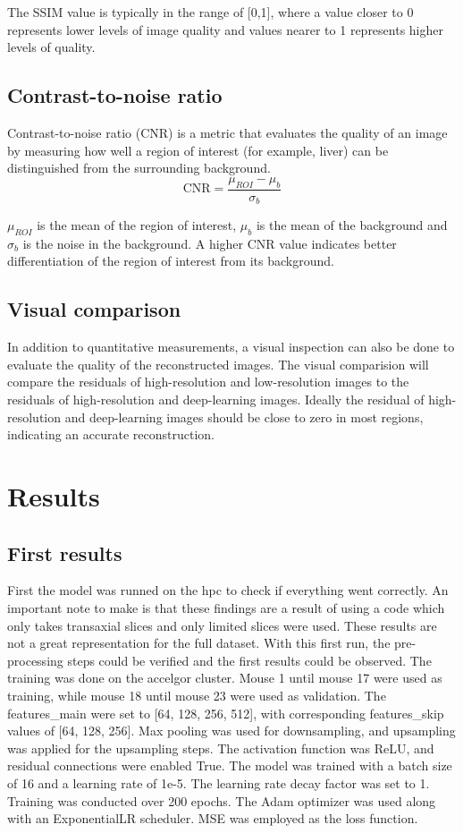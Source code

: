 \documentclass[twocolumn]{article}
\begin{document}
 The SSIM value is typically in the range of [0,1], where a value closer to 0 represents lower levels of image quality and values nearer to 1 represents higher levels of quality. \cite{dosselmann-2009}

 \subsection{Contrast-to-noise ratio}
 Contrast-to-noise ratio (CNR) is a metric that evaluates the quality of an image by measuring how well a region of interest (for example, liver) can be distinguished from the surrounding background.
\begin{equation}\label{CNR}
\text{CNR}=\frac{\mu_{ROI}-\mu_b}{\sigma_b}
\end{equation}

$\mu_{ROI}$ is the mean of the region of interest, $\mu_b$ is the mean of the background and $\sigma_b$ is the noise in the background.
A higher CNR value indicates better differentiation of the region of interest from its background.

\subsection{Visual comparison}
In addition to quantitative measurements, a visual inspection can also be done to evaluate the quality of the reconstructed images. 
The visual comparision will compare the residuals of high-resolution and low-resolution images to the residuals of high-resolution and deep-learning images. 
Ideally the residual of high-resolution and deep-learning images should be close to zero in most regions, indicating an accurate reconstruction. 

\section{Results}
\subsection{First results}
First the model was runned on the hpc to check if everything went correctly. 
An important note to make is that these findings are a result of using a code which only takes transaxial slices and only limited slices were used.
These results are not a great representation for the full dataset.   
With this first run, the pre-processing steps could be verified and the first results could be observed. 
The training was done on the accelgor cluster. 
Mouse 1 until mouse 17 were used as training, while mouse 18 until mouse 23 were used as validation.  
The features\_main were set to [64, 128, 256, 512], with corresponding features\_skip values of [64, 128, 256]. 
Max pooling was used for downsampling, and upsampling was applied for the upsampling steps. 
The activation function was ReLU, and residual connections were enabled True.
The model was trained with a batch size of 16 and a learning rate of 1e-5. 
The learning rate decay factor was set to 1. Training was conducted over 200 epochs. 
The Adam optimizer was used along with an ExponentialLR scheduler. MSE was employed as the loss function.
\end{document}
